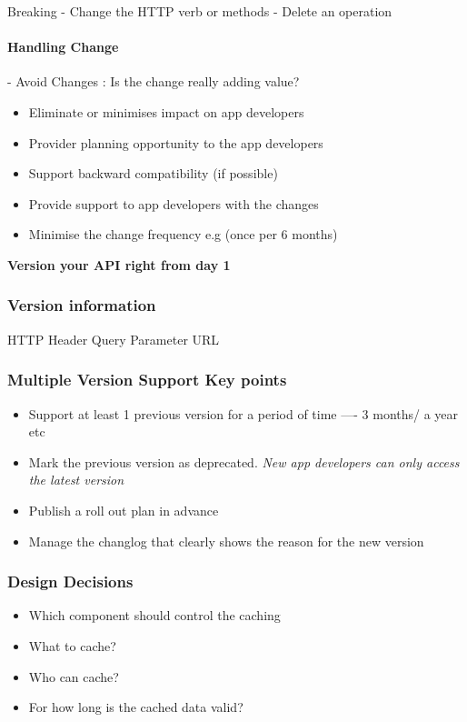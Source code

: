 \documentclass[a4paper, 11pt]{book}
\begin{document}
    Breaking
    - Change the HTTP verb or methods
    - Delete an operation

    \paragraph{Handling Change}
    - Avoid Changes : Is the change really adding value?
    \begin{itemize}
        \item Eliminate or minimises impact on app developers
        \item Provider planning opportunity to the app developers
        \item Support backward compatibility (if possible)
        \item Provide support to app developers with the changes
        \item Minimise the change frequency e.g (once per 6 months)
    \end{itemize}
    \textbf{Version your API right from day 1}

    \subsubsection{Version information}
    HTTP Header
    Query Parameter
    URL

    \subsubsection{Multiple Version Support Key points}
    \begin{itemize}
        \item Support at least 1 previous version for a period of time ---- 3 months/ a year etc
        \item Mark the previous version as deprecated. \textit{New app developers can only access the latest version}
        \item Publish a roll out plan in advance
        \item Manage the changlog that clearly shows the reason for the new version
    \end{itemize}

    \subsubsection{Design Decisions}
    \begin{itemize}
        \item Which component should control the caching
        \item What to cache?
        \item Who can cache?
        \item For how long is the cached data valid?
    \end{itemize}
\end{document}
